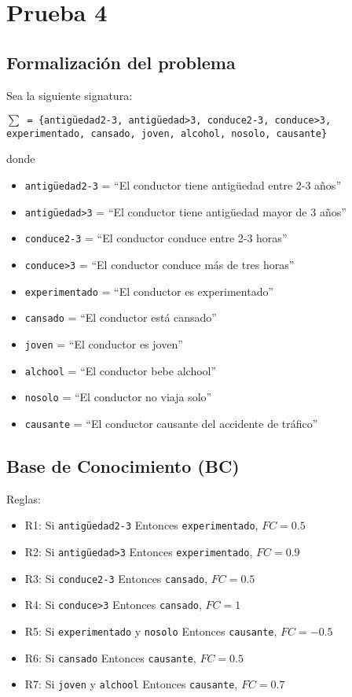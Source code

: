 \section{Prueba 4}

\subsection{Formalización del problema}
\par Sea la siguiente signatura:
\par \texttt{$\sum$ = \{antigüedad2-3, antigüedad>3, conduce2-3, conduce>3, 
experimentado, cansado, joven, alcohol, nosolo, causante\}}
\par donde
\begin{itemize}
    \item \texttt{antigüedad2-3} = ``El conductor tiene antigüedad entre 2-3 años''
    \item \texttt{antigüedad>3} = ``El conductor tiene antigüedad mayor de 3 años''
    \item \texttt{conduce2-3} = ``El conductor conduce entre 2-3 horas''
    \item \texttt{conduce>3} = ``El conductor conduce más de tres horas''
    \item \texttt{experimentado} = ``El conductor es experimentado''
    \item \texttt{cansado} = ``El conductor está cansado''
    \item \texttt{joven} = ``El conductor es joven''
    \item \texttt{alchool} = ``El conductor bebe alchool''
    \item \texttt{nosolo} = ``El conductor no viaja solo''
    \item \texttt{causante} = ``El conductor causante del accidente de tráfico''
\end{itemize}

\subsection{Base de Conocimiento (BC)}
Reglas:
\begin{itemize}
    \item R1: Si \texttt{antigüedad2-3} Entonces \texttt{experimentado}, $FC=0.5$
    \item R2: Si \texttt{antigüedad>3} Entonces \texttt{experimentado}, $FC=0.9$
    \item R3: Si \texttt{conduce2-3} Entonces \texttt{cansado}, $FC=0.5$
    \item R4: Si \texttt{conduce>3} Entonces \texttt{cansado}, $FC=1$
    \item R5: Si \texttt{experimentado} y \texttt{nosolo} Entonces \texttt{causante}, $FC=-0.5$
    \item R6: Si \texttt{cansado} Entonces \texttt{causante}, $FC=0.5$
    \item R7: Si \texttt{joven} y \texttt{alchool} Entonces \texttt{causante}, $FC=0.7$ 
\end{itemize}

